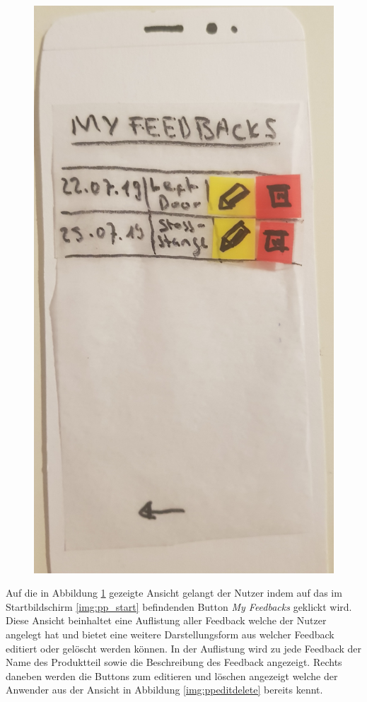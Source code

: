 \begin{figure}[H]
\begin{minipage}{.5\textwidth}
		\includegraphics[width=.8\linewidth]{resources/conception/lowfi_list.jpg}
		\label{fig:pplist}
	\end{minipage}
\end{figure}

Auf die in Abbildung \ref{fig:pplist} gezeigte Ansicht gelangt der Nutzer indem auf das im Startbildschirm \ref{img:pp_start} befindenden Button \textit{My Feedbacks} geklickt wird. 
Diese Ansicht beinhaltet eine Auflistung aller Feedback welche der Nutzer angelegt hat und bietet eine weitere Darstellungsform aus welcher Feedback editiert oder gelöscht werden können. 
In der Auflistung wird zu jede Feedback der Name des Produktteil sowie die Beschreibung des Feedback angezeigt. Rechts daneben werden die Buttons zum editieren und löschen angezeigt welche 
der Anwender aus der Ansicht in Abbildung \ref{img:ppeditdelete} bereits kennt.

